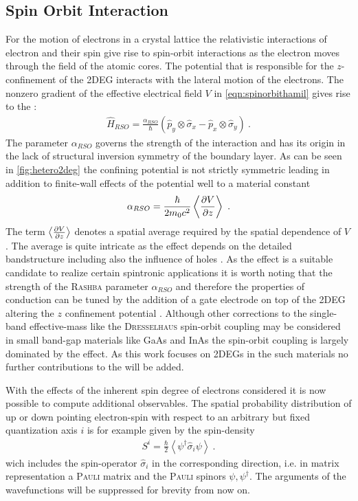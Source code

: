 \subsection{Spin Orbit Interaction}
For the motion of electrons in a crystal lattice the relativistic interactions of electron and their spin give rise to spin-orbit interactions as the electron moves through the field of the atomic cores.
The potential that is responsible for the $z$-confinement of the 2DEG interacts with the lateral motion of the electrons. The nonzero gradient of the effective electrical field $V$ in \cref{eqn:spinorbithamil} gives rise to the \rash{} \hamil{}:
\begin{align}
  \hat{H}_{RSO} =\frac{\alpha_{RSO}}{\hbar}(\hat{p}_{y} \otimes \hat{\sigma}_{x} - \hat{p}_{x} \otimes \hat{\sigma}_{y})\ .
	\label{eqn:rashbahamiltonian}
\end{align}
The parameter $\alpha_{RSO}$ governs the strength of the interaction and has its origin in the lack of structural inversion symmetry of the boundary layer.
As can be seen in \cref{fig:hetero2deg} the confining potential is not strictly symmetric leading in addition to finite-wall effects of the potential well to a material constant \cite{Metalidis2007Thesis}
\begin{align}
\alpha_{RSO} = \frac{\hbar}{2m_0c^2} \left<\frac{\partial V}{\partial z} \right>\ .
\end{align}
The term $\left<\frac{\partial V}{\partial z} \right>$ denotes a spatial average required by the spatial dependence of $V$. The average is quite intricate as the effect depends on the detailed bandstructure including also the influence of holes \cite{JApplPhys.83.4324}.
As the \rash{} effect is a suitable candidate to realize certain spintronic applications it is worth noting that the strength of the \textsc{Rashba} parameter $\alpha_{RSO}$ and therefore the properties of conduction can be tuned by the addition of a gate electrode on top of the 2DEG altering the $z$ confinement potential \cite{PhysRevLett.78.1335}.
Although other corrections to the single-band effective-mass \hamil{} like the \textsc{Dresselhaus} spin-orbit coupling \cite{PhysRev.100.580} may be considered in small band-gap materials like GaAs and InAs the spin-orbit coupling is largely dominated by the \rash{} effect\cite{PhysRevB.61.15588}. As this work focuses on 2DEGs in the such materials no further contributions to the \hamil{} will be added.\par
With the effects of the inherent spin degree of electrons considered it is now possible to compute additional observables. The spatial probability distribution of up or down pointing electron-spin with respect to an arbitrary but fixed quantization axis $i$ is for example given by the spin-density \cite{JPhysA:MathGen.18.671}
\begin{align}
S^i  = \frac{\hbar}{2} \left< \psi^{\dagger} \hat{\sigma}_i \psi \right>\ .
\label{eqn:spindensity}
\end{align}
wich includes the spin-operator $\hat{\sigma}_i$ in the corresponding direction, i.e. in matrix representation a \textsc{Pauli} matrix and the \textsc{Pauli} spinors $\psi,\psi^{\dagger}$. The arguments of the wavefunctions will be suppressed for brevity from now on.
